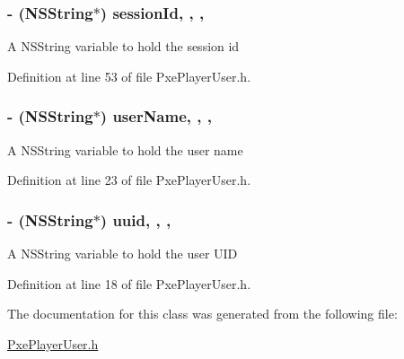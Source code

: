 \hypertarget{interface_pxe_player_user_a618d6c7e2c35d106c6accf4702c87d9a}{
\subsubsection[{session\-Id}]{\setlength{\rightskip}{0pt plus 5cm}-\/ (N\-S\-String$\ast$) session\-Id\hspace{0.3cm}{\ttfamily [read]}, {\ttfamily [write]}, {\ttfamily [nonatomic]}, {\ttfamily [strong]}}}\label{interface_pxe_player_user_a618d6c7e2c35d106c6accf4702c87d9a}
A N\-S\-String variable to hold the session id 

Definition at line 53 of file Pxe\-Player\-User.\-h.

\hypertarget{interface_pxe_player_user_ac61d65d5588236d1d011d2ea1d8aa71c}{
\subsubsection[{user\-Name}]{\setlength{\rightskip}{0pt plus 5cm}-\/ (N\-S\-String$\ast$) user\-Name\hspace{0.3cm}{\ttfamily [read]}, {\ttfamily [write]}, {\ttfamily [nonatomic]}, {\ttfamily [strong]}}}\label{interface_pxe_player_user_ac61d65d5588236d1d011d2ea1d8aa71c}
A N\-S\-String variable to hold the user name 

Definition at line 23 of file Pxe\-Player\-User.\-h.

\hypertarget{interface_pxe_player_user_a485261fd8e11e460f318ba14ef6484e0}{
\subsubsection[{uuid}]{\setlength{\rightskip}{0pt plus 5cm}-\/ (N\-S\-String$\ast$) uuid\hspace{0.3cm}{\ttfamily [read]}, {\ttfamily [write]}, {\ttfamily [nonatomic]}, {\ttfamily [strong]}}}\label{interface_pxe_player_user_a485261fd8e11e460f318ba14ef6484e0}
A N\-S\-String variable to hold the user U\-I\-D 

Definition at line 18 of file Pxe\-Player\-User.\-h.



The documentation for this class was generated from the following file\-:\begin{DoxyCompactItemize}
\item 
\hyperlink{_pxe_player_user_8h}{Pxe\-Player\-User.\-h}\end{DoxyCompactItemize}
